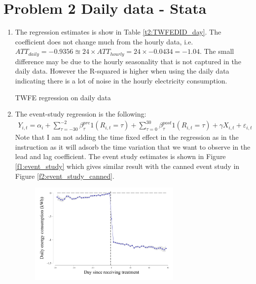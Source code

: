 \documentclass{article}
\begin{document}
\section*{Problem 2 Daily data - Stata}
\begin{enumerate}
    \item The regression estimates is show in Table \ref{t2:TWFEDID_day}. The coefficient does not change much from the hourly data, i.e. $ATT_{daily}=-0.9356 \approxeq 24\times ATT_{hourly}=24\times -0.0434=-1.04 $. The small difference may be due to the hourly seasonality that is not captured in the daily data. However the R-squared is higher when using the daily data indicating there is a lot of noise in the hourly electricity consumption.
    \begin{table}[H]\centering
        \caption{TWFE regression on daily data}
        \label{t2:TWFEDID_day}
        \begin{threeparttable}
        
        \end{threeparttable}
        \end{table}
    \item The event-study regression is the following:
    \begin{align*}
        Y_{i,t}=\alpha_i+\sum_{\tau=-30}^{-2}\beta_\tau^{pre} 1(R_{i,t}=\tau)+\sum_{\tau=0}^{30}\beta_\tau^{post} 1(R_{i,t}=\tau)+\gamma X_{i,t}+\varepsilon_{i,t}
    \end{align*}
    Note that I am not adding the time fixed effect in the regression as in the instruction as it will adsorb the time variation that we want to observe in the lead and lag coefficient. The event study estimates is shown in Figure \ref{f1:event_study} which gives similar result with the canned event study in Figure \ref{f2:event_study_canned}.
    \begin{figure}[H]
        \centering
        \includegraphics[width=0.7\textwidth]{./figure/event_study.pdf}

\end{figure}
\end{enumerate}
\end{document}
